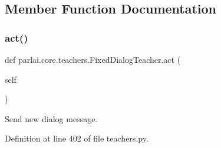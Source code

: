 \subsection{Member Function Documentation}
\mbox{\label{classparlai_1_1core_1_1teachers_1_1FixedDialogTeacher_a759b2dcb341b657fda29c71a7a5354b4}} 
\subsubsection{\texorpdfstring{act()}{act()}}
{\footnotesize\ttfamily def parlai.\+core.\+teachers.\+Fixed\+Dialog\+Teacher.\+act (\begin{DoxyParamCaption}\item[{}]{self }\end{DoxyParamCaption})}

\begin{DoxyVerb}Send new dialog message.
\end{DoxyVerb}
 

Definition at line 402 of file teachers.\+py.


